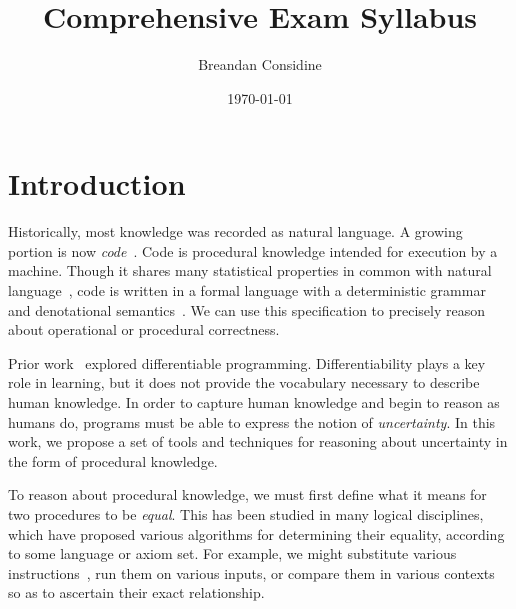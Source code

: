 \documentclass[11pt]{article}
\title{Comprehensive Exam Syllabus}
\author{Breandan Considine}
\date{\today}
\begin{document}
    \maketitle

    \tableofcontents
    \pagebreak

%

    \section{Introduction}

    Historically, most knowledge was recorded as natural language. A growing portion is now \textit{code}~\citep{allamanis2018survey}. Code is procedural knowledge intended for execution by a machine. Though it shares many statistical properties in common with natural language~\citep{hindle2012naturalness}, code is written in a formal language with a deterministic grammar and denotational semantics~\citep{pierce2010software}. We can use this specification to precisely reason about operational or procedural correctness.

    Prior work~\citep{considine2019kotlingrad,considine2019programming} explored differentiable programming. Differentiability plays a key role in learning, but it does not provide the vocabulary necessary to describe human knowledge. In order to capture human knowledge and begin to reason as humans do, programs must be able to express the notion of \textit{uncertainty}. In this work, we propose a set of tools and techniques for reasoning about uncertainty in the form of procedural knowledge.

    To reason about procedural knowledge, we must first define what it means for two procedures to be \textit{equal}. This has been studied in many logical disciplines, which have proposed various algorithms for determining their equality, according to some language or axiom set. For example, we might substitute various instructions~\citep{baader1999term}, run them on various inputs, or compare them in various contexts~\citep{felleisen1990expressive} so as to ascertain their exact relationship.
\end{document}
